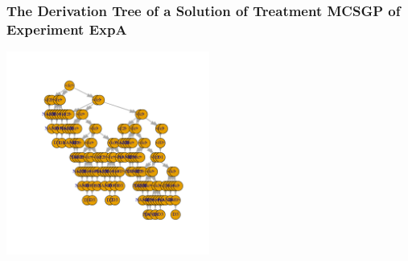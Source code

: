  \begin{frame}
 \frametitle{ The Derivation Tree of a Solution of Treatment MCSGP of Experiment ExpA }
 \begin{center}
\includegraphics[width=0.5\textwidth, angle=0]
{ExpADerivationTreeFigure000.pdf}
 \end{center}
 \label{report/ExpADerivationTreeFigure000.pdf}  
 \end{frame}

